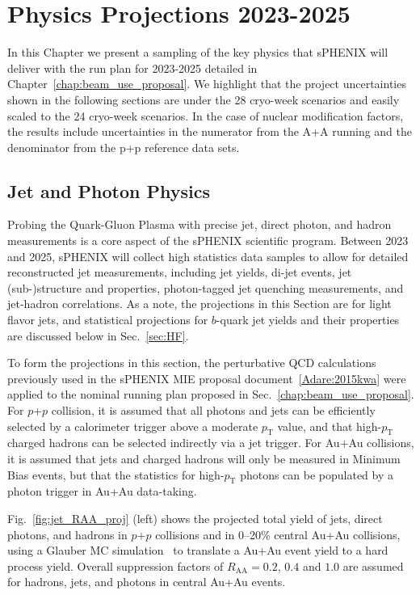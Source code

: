 \chapter{Physics Projections 2023-2025}
\label{chap:physics_projections}

In this Chapter we present a sampling of the key physics that sPHENIX will deliver with the run plan for 2023-2025 detailed in Chapter~\ref{chap:beam_use_proposal}.    We highlight that the project uncertainties shown in the following sections are under the 28 cryo-week scenarios and easily scaled to the 24 cryo-week scenarios.  In the case of nuclear modification factors, the results include uncertainties in the numerator from the A+A running and the denominator from the p+p reference data sets.

\section{Jet and Photon Physics}
\label{sec:jet}

Probing the Quark-Gluon Plasma with precise jet, direct photon, and hadron measurements is a core aspect of the sPHENIX scientific program. Between 2023 and 2025, sPHENIX will collect high statistics data samples to allow for detailed reconstructed jet measurements, including jet yields, di-jet events, jet (sub-)structure and properties, photon-tagged jet quenching measurements, and jet-hadron correlations. As a note, the projections in this Section are for light flavor jets, and statistical projections for $b$-quark jet yields and their properties are discussed below in Sec.~\ref{sec:HF}. 

To form the projections in this section, the perturbative QCD calculations previously used in the sPHENIX MIE proposal document~\ref{Adare:2015kwa} were applied to the nominal running plan proposed in Sec.~\ref{chap:beam_use_proposal}. 
For $p$+$p$ collision, it is assumed that all photons and jets can be efficiently selected by a calorimeter trigger above a moderate $p_\mathrm{T}$ value, and that high-$p_\mathrm{T}$ charged hadrons can be selected indirectly via a jet trigger. For Au+Au collisions, it is assumed that jets and charged hadrons will only be measured in Minimum Bias events, but that the statistics for high-$p_\mathrm{T}$ photons can be populated by a photon trigger in Au+Au data-taking.

Fig.~\ref{fig:jet_RAA_proj} (left) shows the projected total yield of jets, direct photons, and hadrons in $p$+$p$ collisions and in 0--20\% central Au+Au collisions, using a Glauber MC simulation~\cite{Miller:2007ri} to translate a Au+Au event yield to a hard process yield. Overall suppression factors of $R_\mathrm{AA} = 0.2$, $0.4$ and $1.0$ are assumed for hadrons, jets, and photons in central Au+Au events. 

